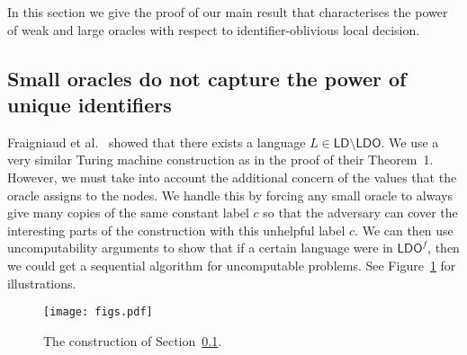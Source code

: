 \documentclass[11pt,a4paper]{article}
\theoremstyle{definition}
\theoremstyle{remark}
\newcommand{\ldo}{\mathsf{LDO}}
\newcommand{\ld}{\mathsf{LD}}
\begin{document}
In this section we give the proof of our main result that characterises the power of weak and large oracles with respect to identifier-oblivious local decision.

\subsection{Small oracles do not capture the power of unique identifiers} \label{ssec:lem-1}

Fraigniaud et al.~\cite{fraigniaud13ld-id} showed that there exists a language $L \in \ld \setminus \ldo$. We use a very similar Turing machine construction as in the proof of their Theorem~1. However, we must take into account the additional concern of the values that the oracle assigns to the nodes. We handle this by forcing any small oracle to always give many copies of the same constant label $c$ so that the adversary can cover the interesting parts of the construction with this unhelpful label $c$. We can then use uncomputability arguments to show that if a certain language were in $\ldo^f$, then we could get a sequential algorithm for uncomputable problems. See Figure~\ref{fig:lem-1} for illustrations.

\begin{figure}[t]
    \centering
    \texttt{[image: figs.pdf]}
    \caption{The construction of Section~\ref{ssec:lem-1}.}\label{fig:lem-1}
\end{figure}

\lemweakseparation*
\end{document}
